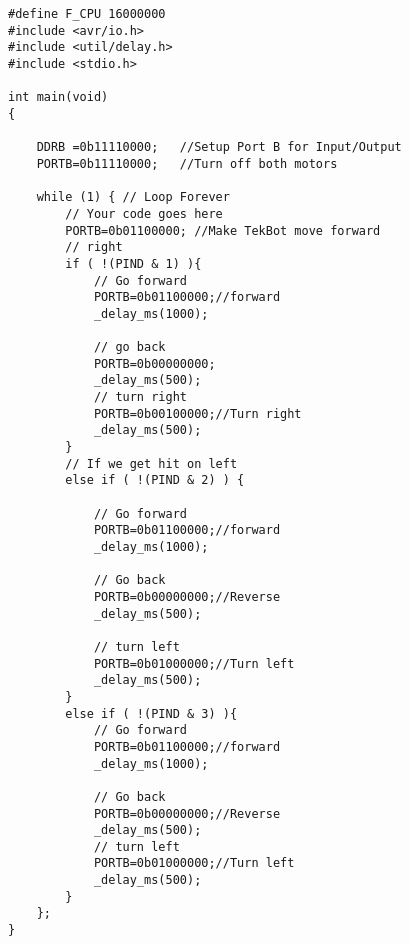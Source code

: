 \documentclass[12pt,letterpaper]{article}
\begin{document}
\begin{verbatim}
#define F_CPU 16000000
#include <avr/io.h>
#include <util/delay.h>
#include <stdio.h>

int main(void)
{

    DDRB =0b11110000;   //Setup Port B for Input/Output
    PORTB=0b11110000;   //Turn off both motors

    while (1) { // Loop Forever
        // Your code goes here
        PORTB=0b01100000; //Make TekBot move forward
        // right
        if ( !(PIND & 1) ){
            // Go forward
            PORTB=0b01100000;//forward
            _delay_ms(1000);

            // go back
            PORTB=0b00000000;
            _delay_ms(500);
            // turn right
            PORTB=0b00100000;//Turn right
            _delay_ms(500);
        }
        // If we get hit on left
        else if ( !(PIND & 2) ) {

            // Go forward
            PORTB=0b01100000;//forward
            _delay_ms(1000);

            // Go back
            PORTB=0b00000000;//Reverse
            _delay_ms(500);

            // turn left
            PORTB=0b01000000;//Turn left
            _delay_ms(500);
        }
        else if ( !(PIND & 3) ){
            // Go forward
            PORTB=0b01100000;//forward
            _delay_ms(1000);

            // Go back
            PORTB=0b00000000;//Reverse
            _delay_ms(500);
            // turn left
            PORTB=0b01000000;//Turn left
            _delay_ms(500);
        }
    };
}
\end{verbatim}
\end{document}
